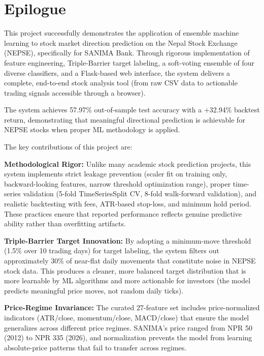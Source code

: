 \documentclass[12pt, a4paper]{report}
\begin{document}
	
	\chapter{Epilogue}
	This project successfully demonstrates the application of ensemble machine learning to stock market direction prediction on the Nepal Stock Exchange (NEPSE), specifically for SANIMA Bank. Through rigorous implementation of feature engineering, Triple-Barrier target labeling, a soft-voting ensemble of four diverse classifiers, and a Flask-based web interface, the system delivers a complete, end-to-end stock analysis tool (from raw CSV data to actionable trading signals accessible through a browser).
	
	The system achieves 57.97\% out-of-sample test accuracy with a +32.94\% backtest return, demonstrating that meaningful directional prediction is achievable for NEPSE stocks when proper ML methodology is applied.
	
	The key contributions of this project are:
	
	\textbf{Methodological Rigor:} Unlike many academic stock prediction projects, this system implements strict leakage prevention (scaler fit on training only, backward-looking features, narrow threshold optimization range), proper time-series validation (5-fold TimeSeriesSplit CV, 8-fold walk-forward validation), and realistic backtesting with fees, ATR-based stop-loss, and minimum hold period. These practices ensure that reported performance reflects genuine predictive ability rather than overfitting artifacts.
	
	\textbf{Triple-Barrier Target Innovation:} By adopting a minimum-move threshold (1.5\% over 10 trading days) for target labeling, the system filters out approximately 30\% of near-flat daily movements that constitute noise in NEPSE stock data. This produces a cleaner, more balanced target distribution that is more learnable by ML algorithms and more actionable for investors (the model predicts meaningful price moves, not random daily ticks).
	
	\textbf{Price-Regime Invariance:} The curated 27-feature set includes price-normalized indicators (ATR/close, momentum/close, MACD/close) that ensure the model generalizes across different price regimes. SANIMA's price ranged from NPR 50 (2012) to NPR 335 (2026), and normalization prevents the model from learning absolute-price patterns that fail to transfer across regimes.
	
\end{document}
